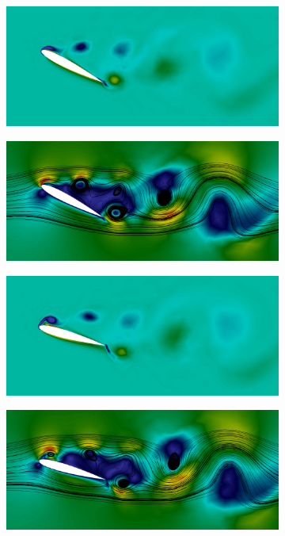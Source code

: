 \begin{figure}[h!]
\begin{subfigure}{.45\linewidth}
        \centering
        \includegraphics[width=\linewidth]{Figuras/rotating-airfoil/vort4.png}
    \end{subfigure}
    \begin{subfigure}{.45\linewidth}
        \centering
        \includegraphics[width=\linewidth]{Figuras/rotating-airfoil/str4.png}
    \end{subfigure}
    \caption*{Instante $t=8,6$.}
    \begin{subfigure}{.45\linewidth}
        \centering
        \includegraphics[width=\linewidth]{Figuras/rotating-airfoil/vort5.png}
    \end{subfigure}
    \begin{subfigure}{.45\linewidth}
        \centering
        \includegraphics[width=\linewidth]{Figuras/rotating-airfoil/str5.png}

\end{subfigure}
\end{figure}
